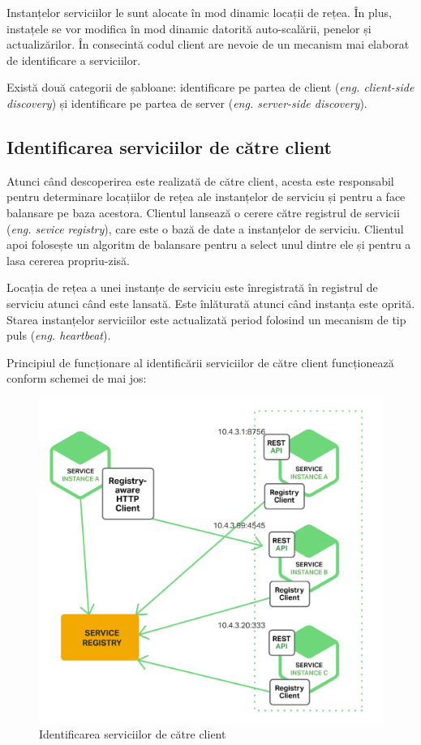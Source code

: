 \documentclass[12pt, a4paper, oneside, romanian]{teza-upb}
\begin{document}
Instanțelor serviciilor le sunt alocate în mod dinamic locații de rețea.  În plus, instațele se vor modifica în mod dinamic datorită auto-scalării, penelor și actualizărilor. În  consecintă codul client are nevoie de un mecanism mai elaborat de identificare a serviciilor. 

Există două categorii de șabloane: identificare pe partea de client (\textit{eng. client-side discovery}) și identificare pe partea de server (\textit{eng. server-side discovery}).

\subsection{Identificarea serviciilor de către client}

Atunci când descoperirea este realizată de către client, acesta este responsabil pentru determinare locațiilor de rețea ale instanțelor de serviciu și pentru a face balansare pe baza acestora. Clientul lansează o cerere către registrul de servicii (\textit{eng. sevice registry}), care este o bază de date a instanțelor de serviciu. Clientul apoi folosește un algoritm de balansare pentru a select unul dintre ele și pentru a lasa cererea propriu-zisă. 

Locația de rețea a unei instanțe de serviciu este înregistrată în registrul de serviciu atunci când este lansată. Este înlăturată atunci când instanța este oprită. Starea instanțelor serviciilor este actualizată period folosind un mecanism de tip puls (\textit{eng. heartbeat}).

\newpage

Principiul de funcționare al identificării serviciilor de către client funcționează conform schemei de mai jos:

\begin{figure}[ht]
\centering
\includegraphics[scale=0.18]{img/Richardson-microservices-part4-2_client-side-pattern.png}
\caption{Identificarea serviciilor de către client}
\label{fig:arhi_componente}
\end{figure}
\end{document}
